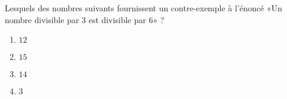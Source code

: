 
\begin{exercice}\label{exosmath-0840}

    Lesquels des nombres suivants fournissent un contre-exemple à l'énoncé «Un nombre divisible par 3 est divisible par 6» ?
    \begin{multicols}{2}
        \begin{enumerate}
            \item
                \( 12\)
            \item
                \( 15\)
            \item
                \( 14\)
            \item
                \( 3\)
        \end{enumerate}
    \end{multicols}

\end{exercice}

